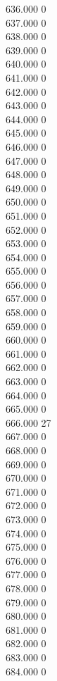 { 636.000	0 \\
 637.000	0 \\
 638.000	0 \\
 639.000	0 \\
 640.000	0 \\
 641.000	0 \\
 642.000	0 \\
 643.000	0 \\
 644.000	0 \\
 645.000	0 \\
 646.000	0 \\
 647.000	0 \\
 648.000	0 \\
 649.000	0 \\
 650.000	0 \\
 651.000	0 \\
 652.000	0 \\
 653.000	0 \\
 654.000	0 \\
 655.000	0 \\
 656.000	0 \\
 657.000	0 \\
 658.000	0 \\
 659.000	0 \\
 660.000	0 \\
 661.000	0 \\
 662.000	0 \\
 663.000	0 \\
 664.000	0 \\
 665.000	0 \\
 666.000	27 \\
 667.000	0 \\
 668.000	0 \\
 669.000	0 \\
 670.000	0 \\
 671.000	0 \\
 672.000	0 \\
 673.000	0 \\
 674.000	0 \\
 675.000	0 \\
 676.000	0 \\
 677.000	0 \\
 678.000	0 \\
 679.000	0 \\
 680.000	0 \\
 681.000	0 \\
 682.000	0 \\
 683.000	0 \\
 684.000	0 \\
}
